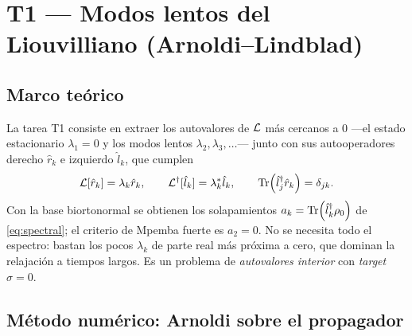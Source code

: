 \chapter{T1 --- Modos lentos del Liouvilliano (Arnoldi--Lindblad)}
\label{ch:t1}


\section{Marco teórico}

La tarea T1 consiste en extraer los autovalores de $\mathcal{L}$ más cercanos a $0$ ---el
estado estacionario $\lambda_1=0$ y los modos lentos $\lambda_2,\lambda_3,\dots$---
junto con sus autooperadores derecho $\hat r_k$ e izquierdo $\hat l_k$, que cumplen
\begin{equation}
    \mathcal{L}[\hat r_k]=\lambda_k\hat r_k, \qquad
    \mathcal{L}^\dagger[\hat l_k]=\lambda_k^*\hat l_k, \qquad
    \Tr(\hat l_j^\dagger \hat r_k)=\delta_{jk}.
\end{equation}
Con la base biortonormal se obtienen los solapamientos $a_k=\Tr(\hat l_k^\dagger\rho_0)$
de \cref{eq:spectral}; el criterio de Mpemba fuerte es $a_2=0$. No se necesita
todo el espectro: bastan los pocos $\lambda_k$ de parte real más próxima a cero,
que dominan la relajación a tiempos largos. Es un problema de \emph{autovalores
interior} con \emph{target} $\sigma=0$.

\section{Método numérico: Arnoldi sobre el propagador}

